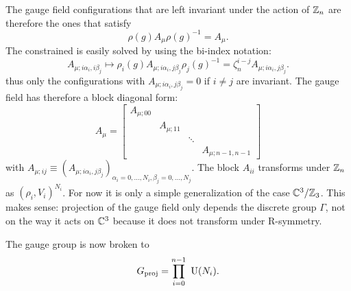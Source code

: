         The gauge field configurations that are left invariant under the action of $\mathbb{Z}_n$ are therefore the ones that satisfy
        \begin{equation}
            \rho(g)A_\mu\rho(g)^{-1}=A_\mu.
        \end{equation}
        The constrained is easily solved by using the bi-index notation:
        \begin{equation}
            A_{\mu;i\alpha_i,i\beta_j}\mapsto \rho_i(g)A_{\mu;i\alpha_i,j\beta_j}\rho_j(g)^{-1}=\zeta^{i-j}_nA_{\mu;i\alpha_i,j\beta_j}.
        \end{equation}
        thus only the configurations with $A_{\mu;i\alpha_i,j\beta_j}=0$ if $i\neq j$ are invariant. The gauge field has therefore a block diagonal form:
        \begin{equation}
            A_\mu=
            \begin{bmatrix}
                A_{\mu;00} & & & \\
                & A_{\mu;11} & & \\
                & & \ddots & \\
                & & & A_{\mu;n-1,n-1}
            \end{bmatrix}
        \end{equation}
        with $A_{\mu;ij}\equiv (A_{\mu;i\alpha_i,j\beta_j})_{\alpha_i=0,\dots,N_i,\beta_j=0,\dots,N_j}$. The block $A_{ii}$ transforms under $\mathbb{Z}_n$ as $(\rho_i,V_i)^{N_i}$. For now it is only a simple generalization of the case $\mathbb{C}^3/\mathbb{Z}_3$. This makes sense: projection of the gauge field only depends the discrete group $\Gamma$, not on the way it acts on $\mathbb{C}^3$ because it does not transform under R-symmetry.
        
        The gauge group is now broken to
        \begin{equation}
            G_{\text{proj}}=\prod^{n-1}_{i=0}~\text{U}(N_i).
        \end{equation}

